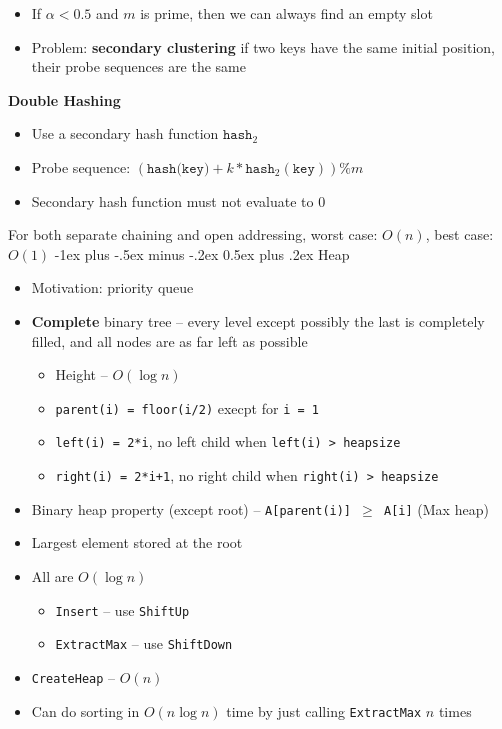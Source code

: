 \documentclass[10pt,landscape,a4paper]{article}
\makeatletter
\renewcommand{\section}{\@startsection{section}{1}{0mm}%
                                {-1ex plus -.5ex minus -.2ex}%
                                {0.5ex plus .2ex}%
                                {\normalfont\large\bfseries}}
\makeatother
\begin{document}
\begin{multicols}{4}
\begin{itemize}
	\item If  $\alpha<0.5$ and  $m$ is prime, then we can always find an empty slot
	\item Problem: \textbf{secondary clustering} if two keys have the same initial position, their probe sequences are the same
\end{itemize}
\textbf{Double Hashing}
\begin{itemize}
	\item Use a secondary hash function $\texttt{hash}_2$
	\item Probe sequence: $(\texttt{hash(key)}+k*\texttt{hash}_2(\texttt{key}))\%m$
	\item Secondary hash function must not evaluate to $0$ 
\end{itemize}
For both separate chaining and open addressing, worst case: $O(n)$, best case:  $O(1)$
\section{Heap}
\begin{itemize}
	\item Motivation: priority queue
	\item \textbf{Complete} binary tree -- every level except possibly the last is completely filled, and all nodes are as far left as possible
		\begin{itemize}
			\item Height --  $O(\log n)$
			\item \texttt{parent(i) = floor(i/2)} execpt for \texttt{i = 1}
			\item \texttt{left(i) = 2*i}, no left child when \texttt{left(i) > heapsize}
			\item \texttt{right(i) = 2*i+1}, no right child when \texttt{right(i) > heapsize}
		\end{itemize}
	\item Binary heap property (except root) -- \texttt{A[parent(i)] $\geq$ A[i]} (Max heap)
	\item Largest element stored at the root
	\item All are $O(\log n)$
		\begin{itemize}
			\item \texttt{Insert} -- use \texttt{ShiftUp}
			\item \texttt{ExtractMax} -- use \texttt{ShiftDown}
		\end{itemize}
	\item \texttt{CreateHeap} -- $O(n)$
	\item Can do sorting in $O(n\log n)$ time by just calling \texttt{ExtractMax} $n$ times
\end{itemize}

\end{multicols}
\end{document}
